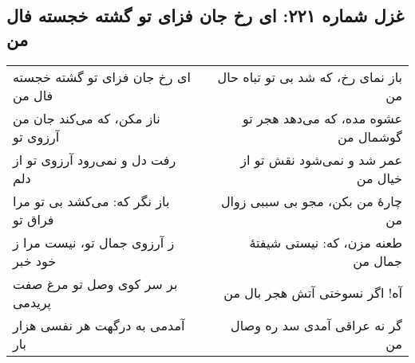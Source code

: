 \begin{center}
\section*{غزل شماره ۲۲۱: ای رخ جان فزای تو گشته خجسته فال من}
\label{sec:221}
\begin{longtable}{l p{0.5cm} r}
ای رخ جان فزای تو گشته خجسته فال من
&&
باز نمای رخ، که شد بی تو تباه حال من
\\
ناز مکن، که می‌کند جان من آرزوی تو
&&
عشوه مده، که می‌دهد هجر تو گوشمال من
\\
رفت دل و نمی‌رود آرزوی تو از دلم
&&
عمر شد و نمی‌شود نقش تو از خیال من
\\
باز نگر که: می‌کشد بی تو مرا فراق تو
&&
چارهٔ من بکن، مجو بی سببی زوال من
\\
ز آرزوی جمال تو، نیست مرا ز خود خبر
&&
طعنه مزن، که: نیستی شیفتهٔ جمال من
\\
بر سر کوی وصل تو مرغ صفت پریدمی
&&
آه! اگر نسوختی آتش هجر بال من
\\
آمدمی به درگهت هر نفسی هزار بار
&&
گر نه عراقی آمدی سد ره وصال من
\\
\end{longtable}
\end{center}
